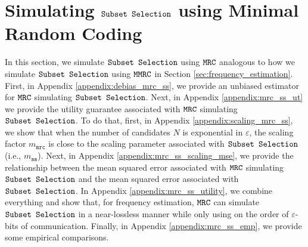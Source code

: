 \section{Simulating \texorpdfstring{$\texttt{Subset Selection}$}{Subset Selection} using Minimal Random Coding}\label{appendix:mrc_ss}

In this section, we simulate $\texttt{Subset Selection}$ using $\texttt{MRC}$ analogous to how we simulate $\texttt{Subset Selection}$ using $\texttt{MMRC}$ in Section \ref{sec:frequency_estimation}. 
First, in Appendix \ref{appendix:debias_mrc_ss}, we provide an unbiased estimator for $\texttt{MRC}$ simulating $\texttt{Subset Selection}$.
Next, in Appendix \ref{appendix:mrc_ss_ut} we provide the utility guarantee associated with $\texttt{MRC}$ simulating $\texttt{Subset Selection}$. 
To do that, first, in Appendix \ref{appendix:scaling_mrc_ss}, we show that when the number of candidates $N$ is exponential in $\varepsilon$, the scaling factor $m_{\texttt{mrc}}$ is close to the scaling parameter associated with $\texttt{Subset Selection}$ (i.e., $m_{\texttt{ss}}$). 
Next, in Appendix \ref{appendix:mrc_ss_scaling_mse}, we provide the relationship between the mean squared error associated with $\texttt{MRC}$ simulating $\texttt{Subset Selection}$ and the mean squared error associated with $\texttt{Subset Selection}$. In Appendix \ref{appendix:mrc_ss_utility}, we combine everything and show that, for frequency estimation, $\texttt{MRC}$ can simulate $\texttt{Subset Selection}$ in a near-lossless manner while only using on the order of $\varepsilon$-bits of communication. Finally, in Appendix \ref{appendix:mrc_ss_emp}, we provide some empirical comparisons.

